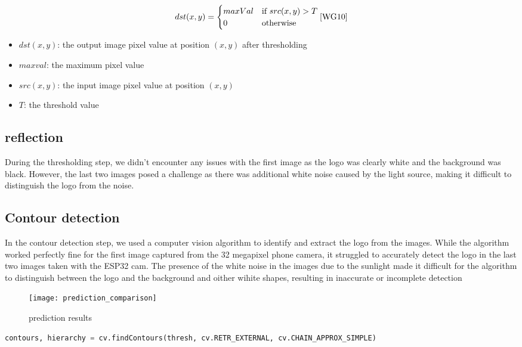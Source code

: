 \begin{equation}
dst(x,y) = \begin{cases}
maxVal &\text{if } src(x,y) > T \\
0 &\text{otherwise}
\end{cases}
\cite{WG10}
\end{equation}
\begin{itemize}
\item $dst(x,y)$: the output image pixel value at position $(x,y)$ after thresholding
\item $maxval$: the maximum pixel value 
\item $src(x,y)$: the input image pixel value at position $(x,y)$
\item $T$: the threshold value 
\end{itemize}
\subsection{reflection}
During the thresholding step, we didn't encounter any issues with the first image as the logo was clearly white and the background was black. However, the last two images posed a challenge as there was additional white noise caused by the light source, making it difficult to distinguish the logo from the noise.
\subsection{Contour detection}
In the contour detection step, we used a computer vision algorithm to identify and extract the logo from the images. While the algorithm worked perfectly fine for the first image captured from the 32 megapixel phone camera, it struggled to accurately detect the logo in the last two images taken with the ESP32 cam. The presence of the white noise in the images due to the sunlight made it difficult for the algorithm to distinguish between the logo and the background and oither wihite shapes, resulting in inaccurate or incomplete detection
\FloatBarrier
\begin{figure}[h]

         \centering
        \texttt{[image: prediction\_comparison]}
   
        \caption{prediction results}
        \label{fig:prediction results}
\FloatBarrier
    \end{figure}
\FloatBarrier

\FloatBarrier
\begin{lstlisting}[language=Python]
    contours, hierarchy = cv.findContours(thresh, cv.RETR_EXTERNAL, cv.CHAIN_APPROX_SIMPLE)

\end{lstlisting}
\FloatBarrier



